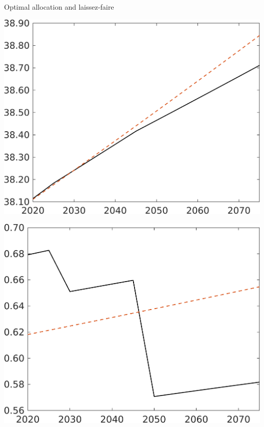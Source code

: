 \documentclass[11pt,aspectratio=169]{beamer}
\begin{document}
\begin{frame}{Optimal allocation and laissez-faire}
\begin{minipage}[]{0.32\textwidth}
	\end{minipage}
	\begin{minipage}[]{0.32\textwidth}
		\includegraphics[width=1\textwidth]{../codding_model/own_basedOnFried/optimalPol_elastS_DisuSci/figures/all_1705/A_BAUCompOPT_T_NoTaus_spillover0_noskill0_sep1_BN0_ineq0_red0_xgrowth0_etaa0.79_lgd0.png}
	\end{minipage}
	\begin{minipage}[]{0.32\textwidth}
		\includegraphics[width=1\textwidth]{../codding_model/own_basedOnFried/optimalPol_elastS_DisuSci/figures/all_1705/C_BAUCompOPT_T_NoTaus_spillover0_noskill0_sep1_BN0_ineq0_red0_xgrowth0_etaa0.79_lgd0.png}

\end{minipage}
\end{frame}
\end{document}
